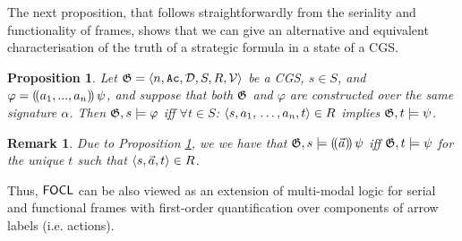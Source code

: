 \documentclass{article}
\newtheorem{proposition}{Proposition}
\newtheorem{remark}{Remark}
\begin{document}
The next proposition, that follows straightforwardly from the seriality and functionality of frames, shows that we can give an alternative and equivalent characterisation of the truth of a strategic formula in a state of  a CGS.  

\begin{proposition}
\label{prop:altSem}
    Let $\mathfrak{G} = \langle n,\texttt{Ac}, \mathcal{D}, S,R, \mathcal{V}  \rangle$ be a CGS, $s \in S$, and $\varphi = (\!( {a_1},..., {a_n} )\!)\, \psi$, and suppose that both $\mathfrak{G}$ and $\varphi$ are constructed over the same signature $\alpha$. %
    Then $\mathfrak{G},s \models \varphi$ iff %
    $\forall t \in S$: $\langle s,a_1,\,\ldots, a_n,t \rangle\in R$ implies $\mathfrak{G},t\models \psi$. 
    
     \end{proposition}

   \begin{remark}
      Due to Proposition \ref{prop:altSem}, we %
      we have that
      $\mathfrak{G},s\models (\!( \vec a )\!)\,\psi$ iff  $\mathfrak{G},t\models \psi$ for the unique $t$ such that $\langle s,\vec{a},t \rangle\in R$. 
   \end{remark}
   
Thus, $\mathsf{FOCL}$ can be also viewed as an extension of multi-modal logic \cite{thebluebible,hennessy80} for serial and functional frames with first-order quantification over components of arrow labels (i.e. actions). 
   
   
\end{document}
